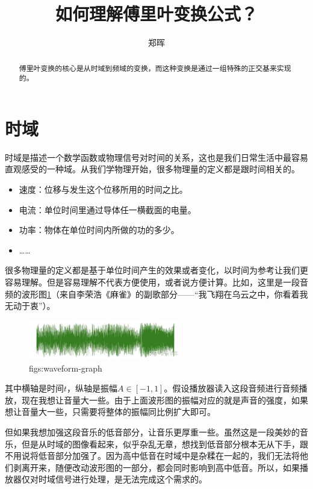\documentclass[lang=cn,11pt,a4paper,cite=numbers]{elegantpaper}
\title{如何理解傅里叶变换公式？}
\author{郑晖}
\date{\zhtoday}
\begin{document}
\maketitle

\begin{abstract}
傅里叶变换的核心是从时域到频域的变换，而这种变换是通过一组特殊的正交基来实现的。
\end{abstract}

\section{时域}
  时域是描述一个数学函数或物理信号对时间的关系，这也是我们日常生活中最容易直观感受的一种域。从我们学物理开始，很多物理量的定义都是跟时间相关的。
\begin{itemize}
  \item 速度：位移与发生这个位移所用的时间之比。
  \item 电流：单位时间里通过导体任一横截面的电量。
  \item 功率：物体在单位时间内所做的功的多少。
  \item ……
\end{itemize}
  很多物理量的定义都是基于单位时间产生的效果或者变化，以时间为参考让我们更容易理解。但是容易理解不代表方便使用，或者说方便计算。比如，这里是一段音频的波形图\ref{figs:waveform-graph}（来自李荣浩《麻雀》的副歌部分——“我飞翔在乌云之中，你看着我无动于衷”）。
\begin{figure}[!htb]
  \centering
  \includegraphics[width=0.6\textwidth]{figs/waveform-graph.png}
  \caption{figs:waveform-graph}
  \label{figs:waveform-graph}
\end{figure}
其中横轴是时间$t$，纵轴是振幅$A\in[-1,1]$。假设播放器读入这段音频进行音频播放，现在我想让音量大一些。由于上面波形图的振幅对应的就是声音的强度，如果想让音量大一些，只需要将整体的振幅同比例扩大即可。

  但如果我想加强这段音乐的低音部分，让音乐更厚重一些。虽然这是一段美妙的音乐，但是从时域的图像看起来，似乎杂乱无章，想找到低音部分根本无从下手，跟不用说将低音部分加强了。因为高中低音在时域中是杂糅在一起的，我们无法将他们剥离开来，随便改动波形图的一部分，都会同时影响到高中低音。所以，如果播放器仅对时域信号进行处理，是无法完成这个需求的。
\end{document}

